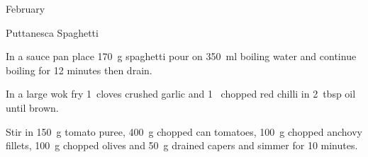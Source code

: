 \begin{menu}{February}
\begin{recipe}{1}{Puttanesca Spaghetti}
\begin{ingredients}
		\end{ingredients}
	
	
	
    \begin{instructions}
    \item 
    In a
    sauce pan
    place
    170~g  spaghetti
    pour on
    350~ml  boiling water
    and continue boiling for 12 minutes then drain.
  \item 
        In a large wok fry
        1~cloves crushed garlic
        and
        1~ chopped red chilli
        in
        2~tbsp  oil
        until brown.
      \item 
        Stir in
        150~g  tomato puree,
        400~g chopped can tomatoes,
        100~g chopped anchovy fillets,
        100~g chopped olives
        and
        50~g drained capers
        and simmer for 10 minutes.
      
    \end{instructions}
    \end{recipe}%
  
    \clearpage
    \end{menu}
	
